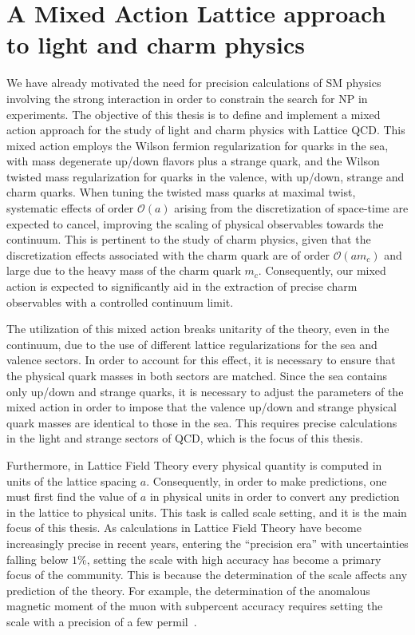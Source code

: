 \section*{A Mixed Action Lattice approach to light and charm physics}

We have already motivated the need for precision calculations of SM physics involving the strong interaction in order to constrain the search for NP in experiments. The objective of this thesis is to define and implement a mixed action approach for the study of light and charm physics with Lattice QCD. This mixed action employs the Wilson fermion regularization for quarks in the sea, with mass degenerate up/down flavors plus a strange quark, and the Wilson twisted mass regularization for quarks in the valence, with up/down, strange and charm quarks. When tuning the twisted mass quarks at maximal twist, systematic effects of order $\mathcal{O}(a)$ arising from the discretization of space-time are expected to cancel, improving the scaling of physical observables towards the continuum. This is pertinent to the study of charm physics, given that the discretization effects associated with the charm quark are of order $\mathcal{O}(am_c)$ and large due to the heavy mass of the charm quark $m_c$. Consequently, our mixed action is expected to significantly aid in the extraction of precise charm observables with a controlled continuum limit.

The utilization of this mixed action breaks unitarity of the theory, even in the continuum, due to the use of different lattice regularizations for the sea and valence sectors. In order to account for this effect, it is necessary to ensure that the physical quark masses in both sectors are matched. Since the sea contains only up/down and strange quarks, it is necessary to adjust the parameters of the mixed action in order to impose that the valence up/down and strange physical quark masses are identical to those in the sea. This requires precise calculations in the light and strange sectors of QCD, which is the focus of this thesis.

Furthermore, in Lattice Field Theory every physical quantity is computed in units of the lattice spacing $a$. Consequently, in order to make predictions, one must first find the value of $a$ in physical units in order to convert any prediction in the lattice to physical units. This task is called scale setting, and it is the main focus of this thesis. As calculations in Lattice Field Theory have become increasingly precise in recent years, entering the ``precision era'' with uncertainties falling below $1\%$, setting the scale with high accuracy has become a primary focus of the community. This is because the determination of the scale affects any prediction of the theory. For example, the determination of the anomalous magnetic moment of the muon with subpercent accuracy requires setting the scale with a precision of a few permil~\citep{Borsanyi:2020mff}.

